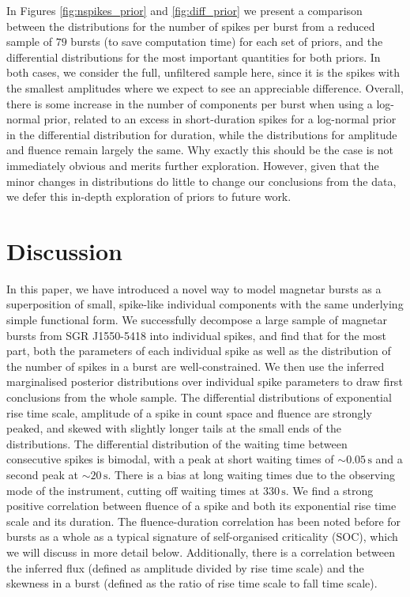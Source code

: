 \documentclass[12pt]{emulateapj}
\begin{document}
In Figures \ref{fig:nspikes_prior} and \ref{fig:diff_prior} we present a comparison between the distributions for the number of spikes 
per burst from a reduced sample of $79$ bursts (to save computation time) for each set of priors, and the differential distributions for the most important quantities for both priors.
In both cases, we consider the full, unfiltered sample here, since it is the spikes with the smallest amplitudes where we expect to see
an appreciable difference. Overall, there is some increase in the number of components per burst when using a log-normal prior, related to
an excess in short-duration spikes for a log-normal prior in the differential 
distribution for duration, while the distributions for amplitude and fluence remain largely the same. Why exactly this should be the case is not immediately 
obvious and merits further exploration. However, given that the minor changes in distributions do little to change our conclusions from the data, we defer this 
in-depth exploration of priors to future work.


\section{Discussion}
\label{ch6:discussion}

In this paper, we have introduced a novel way to model magnetar bursts as a superposition of small, spike-like individual components with the same
underlying simple functional form. We successfully decompose a large sample of magnetar bursts from SGR J1550-5418 into individual spikes, and 
find that for the most part, both the parameters of each individual spike as well as the distribution of the number of spikes in a burst are well-constrained.
We then use the inferred marginalised posterior distributions over individual spike parameters to draw first conclusions from the whole sample. 
The differential distributions of exponential rise time scale, amplitude of a spike in count space and fluence are strongly peaked, and skewed with slightly longer
tails at the small ends of the distributions. The differential distribution of the waiting time between consecutive spikes is bimodal, with a peak at short waiting times
of $\sim\!\!0.05\,\mathrm{s}$ and a second peak at $\sim\!\! 20\,\mathrm{s}$. There is a bias at long waiting times due to the observing mode of the instrument, cutting off
waiting times at $330\,\mathrm{s}$. 
We find a strong positive correlation between fluence of a spike and both its exponential rise time scale and its duration. The fluence-duration correlation has been noted
before for bursts as a whole \citep{gogus1999,gogus2000,vanderhorst2012} as a typical signature of self-organised criticality (SOC), which we will discuss in more 
detail below. 
Additionally, there is a correlation between
the inferred flux (defined as amplitude divided by rise time scale) and the skewness in a burst (defined as the ratio of rise time scale to fall time scale). 
\end{document}

